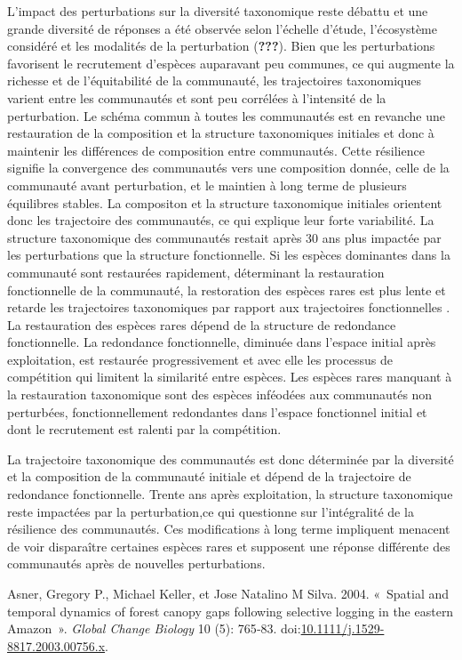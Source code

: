 \documentclass[11pt,french,A4paper,extrafontsizes,onecolumn,openright]{memoir}
\begin{document}
L'impact des perturbations sur la diversité taxonomique reste débattu et
une grande diversité de réponses a été observée selon l'échelle d'étude,
l'écosystème considéré et les modalités de la perturbation
({\textbf{???}}). Bien que les perturbations favorisent le recrutement
d'espèces auparavant peu communes, ce qui augmente la richesse et de
l'équitabilité de la communauté, les trajectoires taxonomiques varient
entre les communautés et sont peu corrélées à l'intensité de la
perturbation. Le schéma commun à toutes les communautés est en revanche
une restauration de la composition et la structure taxonomiques
initiales et donc à maintenir les différences de composition entre
communautés. Cette résilience signifie la convergence des communautés
vers une composition donnée, celle de la communauté avant perturbation,
et le maintien à long terme de plusieurs équilibres stables. La
compositon et la structure taxonomique initiales orientent donc les
trajectoire des communautés, ce qui explique leur forte variabilité. La
structure taxonomique des communautés restait après 30 ans plus impactée
par les perturbations que la structure fonctionnelle. Si les espèces
dominantes dans la communauté sont restaurées rapidement, déterminant la
restauration fonctionnelle de la communauté, la restoration des espèces
rares est plus lente et retarde les trajectoires taxonomiques par
rapport aux trajectoires fonctionnelles . La restauration des espèces
rares dépend de la structure de redondance fonctionnelle. La redondance
fonctionnelle, diminuée dans l'espace initial après exploitation, est
restaurée progressivement et avec elle les processus de compétition qui
limitent la similarité entre espèces. Les espèces rares manquant à la
restauration taxonomique sont des espèces inféodées aux communautés non
perturbées, fonctionnellement redondantes dans l'espace fonctionnel
initial et dont le recrutement est ralenti par la compétition.

La trajectoire taxonomique des communautés est donc déterminée par la
diversité et la composition de la communauté initiale et dépend de la
trajectoire de redondance fonctionnelle. Trente ans après exploitation,
la structure taxonomique reste impactées par la perturbation,ce qui
questionne sur l'intégralité de la résilience des communautés. Ces
modifications à long terme impliquent menacent de voir disparaître
certaines espèces rares et supposent une réponse différente des
communautés après de nouvelles perturbations.

\hypertarget{refs}{}
\hypertarget{ref-Asner2004}{}
Asner, Gregory P., Michael Keller, et Jose Natalino M Silva. 2004.
«~Spatial and temporal dynamics of forest canopy gaps following
selective logging in the eastern Amazon~». \emph{Global Change Biology}
10 (5): 765‑83.
doi:\href{https://doi.org/10.1111/j.1529-8817.2003.00756.x}{10.1111/j.1529-8817.2003.00756.x}.
\end{document}
